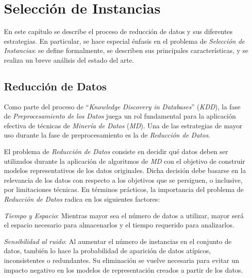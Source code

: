 \chapter{Selección de Instancias}
\label{capitulo1}

En este capítulo se describe el proceso de reducción de datos y sus diferentes estrategias. En particular, se hace especial énfasis en el problema de \emph{Selección de Instancias}: se define formalmente, se describen sus principales características, y se realiza un breve análisis del estado del arte.%

\section{Reducción de Datos}

Como parte del proceso de ``\emph{Knowledge Discovery in Databases}'' (\emph{KDD}), la fase de \emph{Preprocesamiento de los Datos} juega un rol fundamental para la aplicación efectiva de técnicas de \emph{Minería de Datos} (\emph{MD}). Una de las estrategias de mayor uso durante la fase de preprocesamiento es la de \emph{Reducción de Datos}.

El problema de \emph{Reducción de Datos} consiste en decidir qué datos deben ser utilizados durante la aplicación de algoritmos de \emph{MD} con el objetivo de construir modelos representativos de los datos originales. Dicha decisión debe basarse en la relevancia de los datos con respecto a los objetivos que se persiguen, o inclusive, por limitaciones técnicas. En términos prácticos, la importancia del problema de \emph{Reducción de Datos} radica en los siguientes factores:
\begin{inparaenum}
\item \textit{Tiempo y Espacio}: Mientras mayor sea el número de datos a utilizar, mayor será el espacio necesario para almacenarlos y el tiempo requerido para analizarlos. 
\item \textit{Sensibilidad al ruido}: Al aumentar el número de instancias en el conjunto de datos, también lo hace la probabilidad de aparición de datos atípicos, inconsistentes o redundantes. Su eliminación se vuelve necesaria para evitar un impacto negativo en los modelos de representación creados a partir de los datos.
\end{inparaenum}

